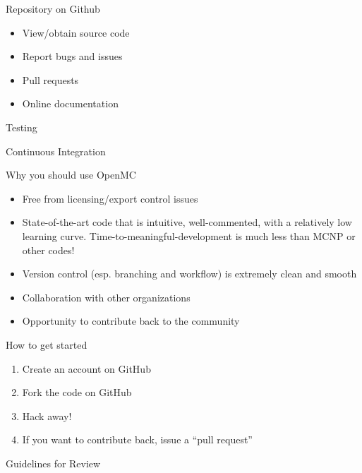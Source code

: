 \documentclass[noamssymb,svgnames]{beamer}
\begin{document}
\begin{frame}{Repository on Github}
  \begin{itemize}
  \item View/obtain source code
  \item Report bugs and issues
  \item Pull requests
  \item Online documentation
  \end{itemize}
\end{frame}

\begin{frame}{Testing}
\end{frame}

\begin{frame}{Continuous Integration}
\end{frame}

\begin{frame}{Why you should use OpenMC}
  \begin{itemize}
  \item Free from licensing/export control issues
  \item State-of-the-art code that is intuitive, well-commented, with a
    relatively low learning curve. Time-to-meaningful-development is much less
    than MCNP or other codes!
  \item Version control (esp. branching and workflow) is extremely clean and
    smooth
  \item Collaboration with other organizations
  \item Opportunity to contribute back to the community
  \end{itemize}
\end{frame}

\begin{frame}{How to get started}
  \begin{enumerate}
  \item Create an account on GitHub
  \item Fork the code on GitHub
  \item Hack away!
  \item If you want to contribute back, issue a ``pull request''
  \end{enumerate}
\end{frame}

\begin{frame}{Guidelines for Review}

\end{frame}
\end{document}
